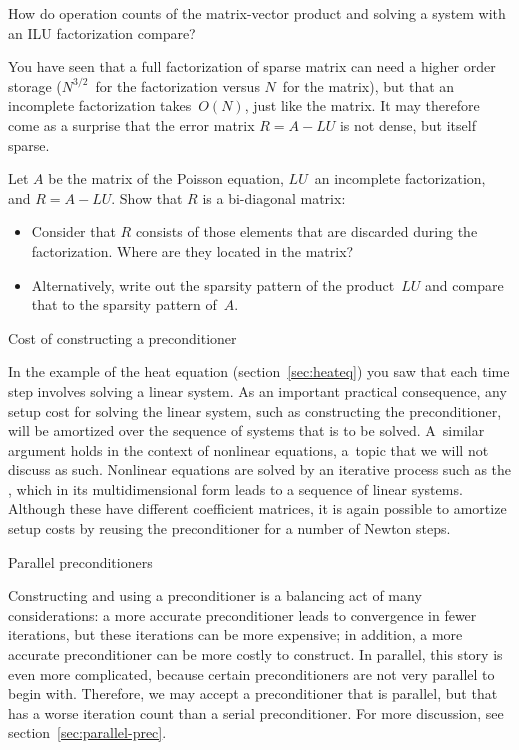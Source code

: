 \begin{exercise}
  How do operation counts of the matrix-vector product and solving a
  system with an \ac{ILU} factorization compare?
\end{exercise}

You have seen that a full factorization of sparse matrix can need a
higher order storage ($N^{3/2}$~for the factorization versus $N$~for
the matrix), but that an incomplete factorization takes~$O(N)$, just
like the matrix. It may therefore come as a surprise that the error
matrix $R=A-LU$ is not dense, but itself sparse.
\begin{exercise}
  Let $A$ be the matrix of the Poisson equation, $LU$~an incomplete
  factorization, and $R=A-LU$. Show that $R$ is a bi-diagonal matrix:
  \begin{itemize}
  \item Consider that $R$ consists of those elements that are
    discarded during the factorization. Where are they located in the
    matrix?
  \item Alternatively, write out the sparsity pattern of the
    product~$LU$ and compare that to the sparsity pattern of~$A$.
  \end{itemize}
\end{exercise}

 {Cost of constructing a preconditioner}

In the example of the heat equation (section~\ref{sec:heateq}) you saw
that each time step involves solving a linear system. As an important
practical consequence, any setup cost for solving the linear system,
such as constructing the preconditioner,
will be amortized over the sequence of systems that is to be
solved. A~similar argument holds in the context of nonlinear
equations, a~topic that we will not discuss as such. Nonlinear
equations are solved by an iterative process such as the
, which in its multidimensional form leads
to a sequence of linear systems. Although these have different
coefficient matrices, it is again possible to amortize setup costs by
reusing the preconditioner for a number of Newton steps.

 {Parallel preconditioners}

Constructing and using a preconditioner is a balancing act of many
considerations: a more accurate preconditioner leads to convergence in
fewer iterations, but these iterations can be more expensive; in
addition, a more accurate preconditioner can be more costly to
construct. In parallel, this story is even more complicated, because
certain preconditioners are not very parallel to begin
with. Therefore, we may accept a preconditioner that is parallel, but
that has a worse iteration count than a serial preconditioner. For
more discussion, see section~\ref{sec:parallel-prec}.

